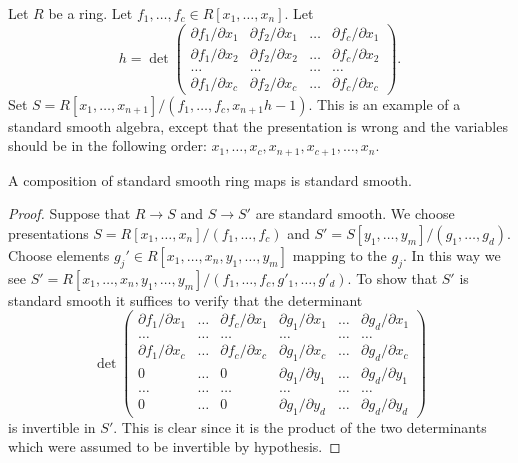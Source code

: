 \begin{example}
\label{example-make-standard-smooth}
Let $R$ be a ring.
Let $f_1, \ldots, f_c \in R[x_1, \ldots, x_n]$.
Let
$$
h =
\det
\left(
\begin{matrix}
\partial f_1/\partial x_1 &
\partial f_2/\partial x_1 &
\ldots &
\partial f_c/\partial x_1 \\
\partial f_1/\partial x_2 &
\partial f_2/\partial x_2 &
\ldots &
\partial f_c/\partial x_2 \\
\ldots & \ldots & \ldots & \ldots \\
\partial f_1/\partial x_c &
\partial f_2/\partial x_c &
\ldots &
\partial f_c/\partial x_c
\end{matrix}
\right).
$$
Set $S = R[x_1, \ldots, x_{n + 1}]/(f_1, \ldots, f_c, x_{n + 1}h - 1)$.
This is an example of a standard smooth algebra, except that the
presentation is wrong and the variables should be in the
following order:
$x_1, \ldots, x_c, x_{n + 1}, x_{c + 1}, \ldots, x_n$.
\end{example}

\begin{lemma}
\label{lemma-compose-standard-smooth}
A composition of standard smooth ring maps is standard smooth.
\end{lemma}

\begin{proof}
Suppose that $R \to S$ and $S \to S'$ are standard smooth. We choose
presentations
$S =  R[x_1, \ldots, x_n]/(f_1, \ldots, f_c)$
and
$S' = S[y_1, \ldots, y_m]/(g_1, \ldots, g_d)$.
Choose elements $g_j' \in R[x_1, \ldots, x_n, y_1, \ldots, y_m]$ mapping
to the $g_j$. In this way we see
$S' = R[x_1, \ldots, x_n, y_1, \ldots, y_m]/
(f_1, \ldots, f_c, g'_1, \ldots, g'_d)$.
To show that $S'$ is standard smooth it suffices to verify
that the determinant
$$
\det
\left(
\begin{matrix}
\partial f_1/\partial x_1 &
\ldots &
\partial f_c/\partial x_1 &
\partial g_1/\partial x_1 &
\ldots &
\partial g_d/\partial x_1 \\
\ldots &
\ldots &
\ldots &
\ldots &
\ldots &
\ldots  \\
\partial f_1/\partial x_c &
\ldots &
\partial f_c/\partial x_c &
\partial g_1/\partial x_c &
\ldots &
\partial g_d/\partial x_c \\
0 &
\ldots &
0 &
\partial g_1/\partial y_1 &
\ldots &
\partial g_d/\partial y_1 \\
\ldots &
\ldots &
\ldots &
\ldots &
\ldots &
\ldots  \\
0 &
\ldots &
0 &
\partial g_1/\partial y_d &
\ldots &
\partial g_d/\partial y_d
\end{matrix}
\right)
$$
is invertible in $S'$. This is clear since it is the product
of the two determinants which were assumed to be invertible
by hypothesis.
\end{proof}

